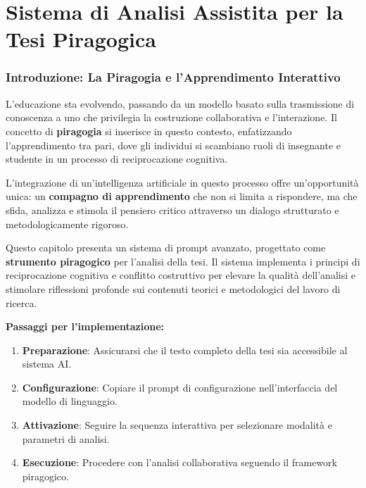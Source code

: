 \chapter{Sistema di Analisi Assistita per la Tesi Piragogica}
\label{appendixC}
\pagestyle{plain}

\subsection{Introduzione: La Piragogia e l'Apprendimento Interattivo}

L'educazione sta evolvendo, passando da un modello basato sulla trasmissione di conoscenza a uno che privilegia la costruzione collaborativa e l'interazione. Il concetto di \textbf{piragogia} si inserisce in questo contesto, enfatizzando l'apprendimento tra pari, dove gli individui si scambiano ruoli di insegnante e studente in un processo di reciprocazione cognitiva.

L'integrazione di un'intelligenza artificiale in questo processo offre un'opportunità unica: un \textbf{compagno di apprendimento} che non si limita a rispondere, ma che sfida, analizza e stimola il pensiero critico attraverso un dialogo strutturato e metodologicamente rigoroso.

Questo capitolo presenta un sistema di prompt avanzato, progettato come \textbf{strumento piragogico} per l'analisi della tesi. Il sistema implementa i principi di reciprocazione cognitiva e conflitto costruttivo per elevare la qualità dell'analisi e stimolare riflessioni profonde sui contenuti teorici e metodologici del lavoro di ricerca.
\begin{tcolorbox}[
	colback=yellow!10!white,
	colframe=orange!70!black,
	title=\textbf{Procedura di Avvio e Attivazione},
	fonttitle=\bfseries\large,
	arc=2mm,
	boxrule=1pt,
	left=6pt,right=6pt,top=6pt,bottom=6pt
	]
	\textbf{Passaggi per l'implementazione:}
	\begin{enumerate}
		\item \textbf{Preparazione}: Assicurarsi che il testo completo della tesi sia accessibile al sistema AI.
		\item \textbf{Configurazione}: Copiare il prompt di configurazione nell'interfaccia del modello di linguaggio.
		\item \textbf{Attivazione}: Seguire la sequenza interattiva per selezionare modalità e parametri di analisi.
		\item \textbf{Esecuzione}: Procedere con l'analisi collaborativa seguendo il framework piragogico.
	\end{enumerate}
\end{tcolorbox}

